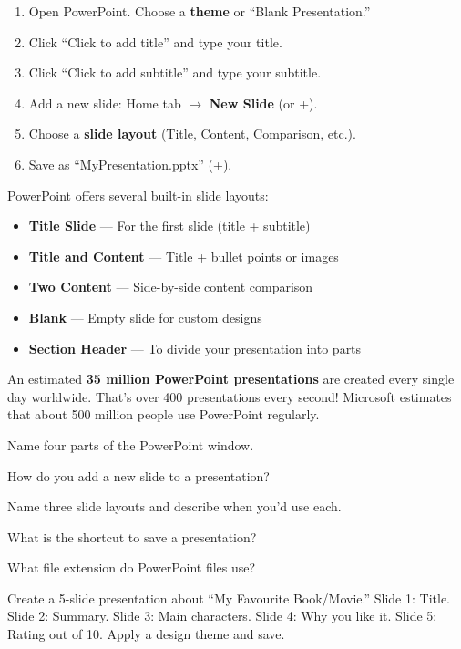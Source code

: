 \begin{labstep}
\begin{enumerate}[label=\protect\stepcircle{\arabic*}, leftmargin=2cm, itemsep=3pt]
  \item Open PowerPoint. Choose a \textbf{theme} or ``Blank Presentation.''
  \item Click ``Click to add title'' and type your title.
  \item Click ``Click to add subtitle'' and type your subtitle.
  \item Add a new slide: Home tab $\rightarrow$ \textbf{New Slide} (or +).
  \item Choose a \textbf{slide layout} (Title, Content, Comparison, etc.).
  \item Save as ``MyPresentation.pptx'' (+).
\end{enumerate}
\end{labstep}

\begin{theorybox}
PowerPoint offers several built-in slide layouts:
\begin{itemize}[leftmargin=*, label={\textcolor{ModuleBlue}{\faAngleRight}}, itemsep=2pt]
  \item \textbf{Title Slide} --- For the first slide (title + subtitle)
  \item \textbf{Title and Content} --- Title + bullet points or images
  \item \textbf{Two Content} --- Side-by-side content comparison
  \item \textbf{Blank} --- Empty slide for custom designs
  \item \textbf{Section Header} --- To divide your presentation into parts
\end{itemize}
\end{theorybox}


\begin{funfact}
An estimated \textbf{35 million PowerPoint presentations} are created every single day worldwide. That's over 400 presentations every second! Microsoft estimates that about 500 million people use PowerPoint regularly.
\end{funfact}

\begin{reviewqs}
  \item Name four parts of the PowerPoint window.
  \item How do you add a new slide to a presentation?
  \item Name three slide layouts and describe when you'd use each.
  \item What is the shortcut to save a presentation?
  \item What file extension do PowerPoint files use?
\end{reviewqs}

\begin{challenge}
Create a 5-slide presentation about ``My Favourite Book/Movie.'' Slide 1: Title. Slide 2: Summary. Slide 3: Main characters. Slide 4: Why you like it. Slide 5: Rating out of 10. Apply a design theme and save.
\end{challenge}
